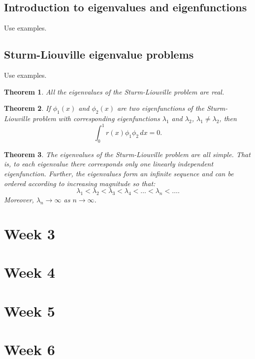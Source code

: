 \documentclass{article}
\newtheorem{theorem}{Theorem}
\begin{document}
\subsection{Introduction to eigenvalues and eigenfunctions}
Use examples.

\subsection{Sturm-Liouville eigenvalue problems}
Use examples.

\begin{theorem}
    All the eigenvalues of the Sturm-Liouville problem are real.
\end{theorem}

\begin{theorem}
    If $\phi_1(x)$ and $\phi_2(x)$ are two eigenfunctions of the Sturm-Liouville problem with corresponding eigenfunctions $\lambda_1$ and $\lambda_2$, $\lambda_1\neq \lambda_2$, then
    \begin{equation}
        \int_0^1 r(x)\phi_1 \phi_2\,dx=0.
    \end{equation}
\end{theorem}
\begin{theorem}
    The eigenvalues of the Sturm-Liouville problem are all simple. That is, to each eigenvalue there corresponds only one linearly independent eigenfunction. Further, the eigenvalues form an infinite sequence and can be ordered according to increasing magnitude so that:
    \begin{equation}
        \lambda_1<\lambda_2<\lambda_3<\lambda_4<\ldots<\lambda_n<\ldots.
    \end{equation}
    Moreover, $\lambda_n\to\infty$ as $n\to\infty$.
\end{theorem}


\section{Week 3}

\section{Week 4}

\section{Week 5}

\section{Week 6}
\end{document}
